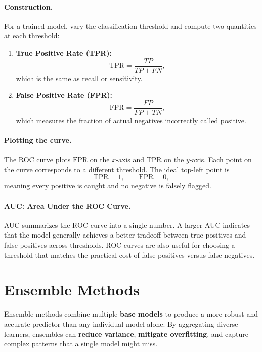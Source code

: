 \documentclass[12pt,openany]{book}
\begin{document}
\paragraph{Construction.}
For a trained model, vary the classification threshold and compute two quantities at each threshold:
\begin{enumerate}[leftmargin=*]
    \item \textbf{True Positive Rate (TPR):}
    \begin{equation*}
        \mathrm{TPR} = \frac{TP}{TP+FN},
    \end{equation*}
    which is the same as recall or sensitivity.
    \item \textbf{False Positive Rate (FPR):}
    \begin{equation*}
        \mathrm{FPR} = \frac{FP}{FP+TN},
    \end{equation*}
    which measures the fraction of actual negatives incorrectly called positive.
\end{enumerate}

\paragraph{Plotting the curve.}
The ROC curve plots \(\mathrm{FPR}\) on the \(x\)-axis and \(\mathrm{TPR}\) on the \(y\)-axis. Each point on the curve corresponds to a different threshold. The ideal top-left point is
\begin{equation*}
    \mathrm{TPR}=1, \qquad \mathrm{FPR}=0,
\end{equation*}
meaning every positive is caught and no negative is falsely flagged.

\paragraph{AUC: Area Under the ROC Curve.}
AUC summarizes the ROC curve into a single number. A larger AUC indicates that the model generally achieves a better tradeoff between true positives and false positives across thresholds. ROC curves are also useful for choosing a threshold that matches the practical cost of false positives versus false negatives.

\section{Ensemble Methods}

Ensemble methods combine multiple \textbf{base models} to produce a more robust and accurate predictor than any individual model alone. By aggregating diverse learners, ensembles can \textbf{reduce variance}, \textbf{mitigate overfitting}, and capture complex patterns that a single model might miss.
\end{document}
